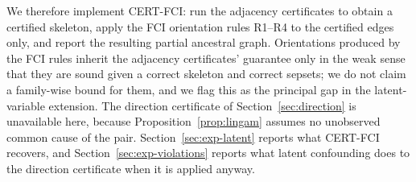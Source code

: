 We therefore implement CERT-FCI: run the adjacency certificates to obtain a
certified skeleton, apply the FCI orientation rules R1--R4 \citep[originally
][in the formulation of \citealp{zhang2008completeness}]{spirtes1995causal} to the certified edges only, and
report the resulting partial ancestral graph. Orientations produced by the FCI
rules inherit the adjacency certificates' guarantee only in the weak sense
that they are sound given a correct skeleton and correct sepsets; we do not
claim a family-wise bound for them, and we flag this as the principal gap in
the latent-variable extension. The direction certificate of
Section~\ref{sec:direction} is unavailable here, because
Proposition~\ref{prop:lingam} assumes no unobserved common cause of the pair.
Section~\ref{sec:exp-latent} reports what CERT-FCI recovers, and
Section~\ref{sec:exp-violations} reports what latent confounding does to the
direction certificate when it is applied anyway.
